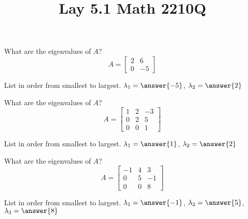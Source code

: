 \documentclass{ximera}
\begin{document}
  	\title{Lay 5.1  \hfill Math 2210Q} 
  	  		    \begin{question} What are the eigenvalues of $A$?
  	  		    	$$A = \begin{bmatrix} 2&6\\ 0& -5\end{bmatrix}$$
  	  		    	
  	  		    List in order from smallest to largest. $\lambda_1 = \answer{-5}$, $\lambda_2 = \answer{2}$\\
  	  		    
  	  		    	
  	  		    \end{question}	
  	  		     \begin{question} What are the eigenvalues of $A$?
  	  		     	$$A = \begin{bmatrix} 1&2&-3\\ 0& 2 &5\\ 0&0& 1\end{bmatrix}$$
  	  		     	
  	  		     	List in order from smallest to largest. $\lambda_1 = \answer{1}$, $\lambda_2 = \answer{2}$\\
  	  		     	
  	  		     	
  	  		     \end{question}	
  	  		     \begin{question} What are the eigenvalues of $A$?
  	  		     	$$A = \begin{bmatrix} -1&4&3\\ 0& 5 &-1\\ 0&0& 8\end{bmatrix}$$
  	  		     	
  	  		     	List in order from smallest to largest. $\lambda_1 = \answer{-1}$, $\lambda_2 = \answer{5}$, $\lambda_3 = \answer{8}$\\
  	  		     	
  	  		     	
  	  		     \end{question}	
\end{document}
